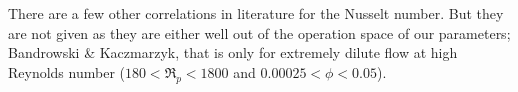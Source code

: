 There are a few other correlations in literature for the Nusselt number. But they are not given as they are either well out of the operation space of our parameters; Bandrowski \& Kaczmarzyk\cite{Bandrowski1977}, that is only for extremely dilute flow at high Reynolds number ($180 < \Re_p < 1800$ and $0.00025 < \phi < 0.05$).




